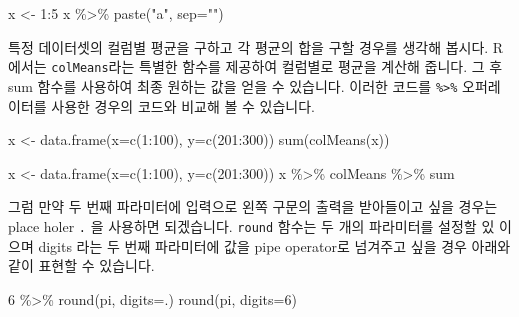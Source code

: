 \documentclass[
]{book}
\newenvironment{Shaded}{\begin{snugshade}}{\end{snugshade}}
\newcommand{\AttributeTok}[1]{\textcolor[rgb]{0.77,0.63,0.00}{#1}}
\newcommand{\DecValTok}[1]{\textcolor[rgb]{0.00,0.00,0.81}{#1}}
\newcommand{\FunctionTok}[1]{\textcolor[rgb]{0.00,0.00,0.00}{#1}}
\newcommand{\NormalTok}[1]{#1}
\newcommand{\OtherTok}[1]{\textcolor[rgb]{0.56,0.35,0.01}{#1}}
\newcommand{\SpecialCharTok}[1]{\textcolor[rgb]{0.00,0.00,0.00}{#1}}
\newcommand{\StringTok}[1]{\textcolor[rgb]{0.31,0.60,0.02}{#1}}
\begin{document}
\begin{Shaded}
\begin{Highlighting}[]
\NormalTok{x }\OtherTok{\textless{}{-}} \DecValTok{1}\SpecialCharTok{:}\DecValTok{5}
\NormalTok{x }\SpecialCharTok{\%\textgreater{}\%} \FunctionTok{paste}\NormalTok{(}\StringTok{"a"}\NormalTok{, }\AttributeTok{sep=}\StringTok{""}\NormalTok{)}
\end{Highlighting}
\end{Shaded}

특정 데이터셋의 컬럼별 평균을 구하고 각 평균의 합을 구할 경우를 생각해 봅시다. R에서는 \texttt{colMeans}라는 특별한 함수를 제공하여 컬럼별로 평균을 계산해 줍니다. 그 후 sum 함수를 사용하여 최종 원하는 값을 얻을 수 있습니다. 이러한 코드를 \texttt{\%\textgreater{}\%} 오퍼레이터를 사용한 경우의 코드와 비교해 볼 수 있습니다.

\begin{Shaded}
\begin{Highlighting}[]
\NormalTok{x }\OtherTok{\textless{}{-}} \FunctionTok{data.frame}\NormalTok{(}\AttributeTok{x=}\FunctionTok{c}\NormalTok{(}\DecValTok{1}\SpecialCharTok{:}\DecValTok{100}\NormalTok{), }\AttributeTok{y=}\FunctionTok{c}\NormalTok{(}\DecValTok{201}\SpecialCharTok{:}\DecValTok{300}\NormalTok{))}
\FunctionTok{sum}\NormalTok{(}\FunctionTok{colMeans}\NormalTok{(x))}

\NormalTok{x }\OtherTok{\textless{}{-}} \FunctionTok{data.frame}\NormalTok{(}\AttributeTok{x=}\FunctionTok{c}\NormalTok{(}\DecValTok{1}\SpecialCharTok{:}\DecValTok{100}\NormalTok{), }\AttributeTok{y=}\FunctionTok{c}\NormalTok{(}\DecValTok{201}\SpecialCharTok{:}\DecValTok{300}\NormalTok{))}
\NormalTok{x }\SpecialCharTok{\%\textgreater{}\%}\NormalTok{ colMeans }\SpecialCharTok{\%\textgreater{}\%}\NormalTok{ sum}
\end{Highlighting}
\end{Shaded}

그럼 만약 두 번째 파라미터에 입력으로 왼쪽 구문의 출력을 받아들이고 싶을 경우는 place holer \texttt{.} 을 사용하면 되겠습니다. \texttt{round} 함수는 두 개의 파라미터를 설정할 있 이으며 digits 라는 두 번째 파라미터에 값을 pipe operator로 넘겨주고 싶을 경우 아래와 같이 표현할 수 있습니다.

\begin{Shaded}
\begin{Highlighting}[]
\DecValTok{6} \SpecialCharTok{\%\textgreater{}\%} \FunctionTok{round}\NormalTok{(pi, }\AttributeTok{digits=}\NormalTok{.)}
\FunctionTok{round}\NormalTok{(pi, }\AttributeTok{digits=}\DecValTok{6}\NormalTok{)}
\end{Highlighting}
\end{Shaded}
\end{document}
